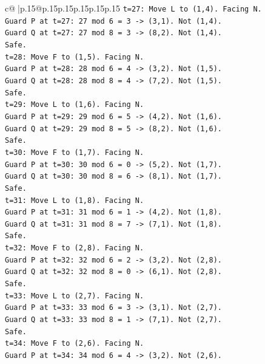 \documentclass{article}
\begin{document}
{\begin{supertabular}{c@{$\;$}|p{.15\linewidth}@{}p{.15\linewidth}p{.15\linewidth}p{.15\linewidth}p{.15\linewidth}p{.15\linewidth}}
{{{\texttt{t=27: Move L to (1,4). Facing N.} \\
\texttt{Guard P at t=27: 27 mod 6 = 3 {-}> (3,1). Not (1,4).} \\
\texttt{Guard Q at t=27: 27 mod 8 = 3 {-}> (8,2). Not (1,4).} \\
\texttt{Safe.} \\
\texttt{t=28: Move F to (1,5). Facing N.} \\
\texttt{Guard P at t=28: 28 mod 6 = 4 {-}> (3,2). Not (1,5).} \\
\texttt{Guard Q at t=28: 28 mod 8 = 4 {-}> (7,2). Not (1,5).} \\
\texttt{Safe.} \\
\texttt{t=29: Move L to (1,6). Facing N.} \\
\texttt{Guard P at t=29: 29 mod 6 = 5 {-}> (4,2). Not (1,6).} \\
\texttt{Guard Q at t=29: 29 mod 8 = 5 {-}> (8,2). Not (1,6).} \\
\texttt{Safe.} \\
\texttt{t=30: Move F to (1,7). Facing N.} \\
\texttt{Guard P at t=30: 30 mod 6 = 0 {-}> (5,2). Not (1,7).} \\
\texttt{Guard Q at t=30: 30 mod 8 = 6 {-}> (8,1). Not (1,7).} \\
\texttt{Safe.} \\
\texttt{t=31: Move L to (1,8). Facing N.} \\
\texttt{Guard P at t=31: 31 mod 6 = 1 {-}> (4,2). Not (1,8).} \\
\texttt{Guard Q at t=31: 31 mod 8 = 7 {-}> (7,1). Not (1,8).} \\
\texttt{Safe.} \\
\texttt{t=32: Move F to (2,8). Facing N.} \\
\texttt{Guard P at t=32: 32 mod 6 = 2 {-}> (3,2). Not (2,8).} \\
\texttt{Guard Q at t=32: 32 mod 8 = 0 {-}> (6,1). Not (2,8).} \\
\texttt{Safe.} \\
\texttt{t=33: Move L to (2,7). Facing N.} \\
\texttt{Guard P at t=33: 33 mod 6 = 3 {-}> (3,1). Not (2,7).} \\
\texttt{Guard Q at t=33: 33 mod 8 = 1 {-}> (7,1). Not (2,7).} \\
\texttt{Safe.} \\
\texttt{t=34: Move F to (2,6). Facing N.} \\
\texttt{Guard P at t=34: 34 mod 6 = 4 {-}> (3,2). Not (2,6).} \\
}}}
\end{supertabular}}
\end{document}
